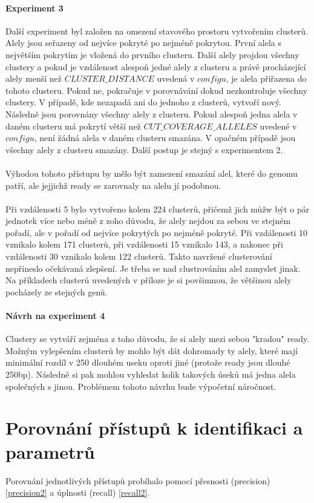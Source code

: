 \documentclass[czech,DP]{thesiskiv}
\numberwithin{equation}{section}
\begin{document}
\subsubsection{Experiment 3}
Další experiment byl založen na omezení stavového prostoru vytvořením clusterů. Alely jsou seřazeny od nejvíce pokryté po nejméně pokrytou. První alela s největším pokrytím je vložená do prvního clusteru. Další alely projdou všechny clustery a pokud je vzdálenost alespoň jedné alely z clusteru a právě procházející alely menší než $CLUSTER\_DISTANCE$ uvedená v $configu$, je alela přiřazena do tohoto clusteru. Pokud ne, pokračuje v porovnávání dokud nezkontroluje všechny clustery. V případě, kde nezapadá ani do jednoho z clusterů, vytvoří nový. Následně jsou porovnány všechny alely z clusteru. Pokud alespoň jedna alela v daném clusteru má pokrytí větší než $CUT\_COVERAGE\_ALLELES$ uvedené v $configu$, není žádná alela v daném clusteru smazána. V opačném případě jsou všechny alely z clusteru smazány. Další postup je stejný s experimentem 2. 
\\
\\
Výhodou tohoto přístupu by mělo být zamezení smazání alel, které do genomu patří, ale jejjichž ready se zarovnaly na alelu jí podobnou. 
\\
\\
Při vzdálenosti 5 bylo vytvořeno kolem 224 clusterů, přičemž jich můžw být o pár jednotek více nebo méně z zoho důvodu, že alely nejdou za sebou ve stejném pořadí, ale v pořadí od nejvíce pokrytých po nejméně pokryté. Při vzdálenosti 10 vznikalo kolem 171 clusterů, při vzdálenosti 15 vznikalo 143, a nakonec při vzdálenosti 30 vznikalo kolem 122 clusterů. Takto navržené clusterování nepřineslo očekávaná zlepšení. Je třeba se nad clustrováním alel zamyslet jinak. Na příkladech clusterů uvedených v příloze je si povšimnou, že většinou alely pocházely ze stejných genů.


\subsubsection{Návrh na experiment 4}
Clustery se vytváří zejména z toho důvodu, že si alely mezi sebou "kradou" ready. Možným vylepšením clusterů by mohlo být dát dohromady ty alely, které mají minimální rozdíl v 250 dlouhém useku oproti jiné (protože ready jsou dlouhé 250bp). Následně si pak mohlou vyhledat kolik takových úseků má jedna alela společných s jinou. Problémem tohoto návrhu bude výpočetní náročnost.
 

\chapter{Porovnání přístupů k identifikaci a parametrů}
Porovnání jednotlivých přístupů probíhalo pomocí přesnosti (precision) \ref{precision2} a úplnosti (recall) \ref{recall2}. 
\end{document}
